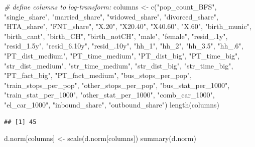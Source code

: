 \documentclass[
]{article}
\newenvironment{Shaded}{\begin{snugshade}}{\end{snugshade}}
\newcommand{\CommentTok}[1]{\textcolor[rgb]{0.56,0.35,0.01}{\textit{#1}}}
\newcommand{\FunctionTok}[1]{\textcolor[rgb]{0.00,0.00,0.00}{#1}}
\newcommand{\NormalTok}[1]{#1}
\newcommand{\OtherTok}[1]{\textcolor[rgb]{0.56,0.35,0.01}{#1}}
\newcommand{\StringTok}[1]{\textcolor[rgb]{0.31,0.60,0.02}{#1}}
\begin{document}
\begin{Shaded}
\begin{Highlighting}[]
\CommentTok{\# define columns to log{-}transform:}
\NormalTok{columns }\OtherTok{\textless{}{-}} \FunctionTok{c}\NormalTok{(}\StringTok{"pop\_count\_BFS"}\NormalTok{, }\StringTok{"single\_share"}\NormalTok{, }\StringTok{"married\_share"}\NormalTok{,}
             \StringTok{"widowed\_share"}\NormalTok{, }\StringTok{"divorced\_share"}\NormalTok{, }\StringTok{"HTA\_share"}\NormalTok{,}
             \StringTok{"FNT\_share"}\NormalTok{, }\StringTok{"X.20"}\NormalTok{, }\StringTok{"X20.40"}\NormalTok{, }\StringTok{"X40.60"}\NormalTok{, }\StringTok{"X.60"}\NormalTok{, }\StringTok{"birth\_munic"}\NormalTok{,}
             \StringTok{"birth\_cant"}\NormalTok{, }\StringTok{"birth\_CH"}\NormalTok{, }\StringTok{"birth\_notCH"}\NormalTok{, }\StringTok{"male"}\NormalTok{, }\StringTok{"female"}\NormalTok{, }
             \StringTok{"resid\_.1y"}\NormalTok{, }\StringTok{"resid\_1.5y"}\NormalTok{, }\StringTok{"resid\_6.10y"}\NormalTok{, }\StringTok{"resid\_.10y"}\NormalTok{,}
             \StringTok{"hh\_1"}\NormalTok{, }\StringTok{"hh\_2"}\NormalTok{, }\StringTok{"hh\_3.5"}\NormalTok{, }\StringTok{"hh\_.6"}\NormalTok{,}
             \StringTok{"PT\_dist\_medium"}\NormalTok{, }\StringTok{"PT\_time\_medium"}\NormalTok{, }\StringTok{"PT\_dist\_big"}\NormalTok{,}
             \StringTok{"PT\_time\_big"}\NormalTok{, }\StringTok{"str\_dist\_medium"}\NormalTok{, }\StringTok{"str\_time\_medium"}\NormalTok{, }
             \StringTok{"str\_dist\_big"}\NormalTok{, }\StringTok{"str\_time\_big"}\NormalTok{, }\StringTok{"PT\_fact\_big"}\NormalTok{, }\StringTok{"PT\_fact\_medium"}\NormalTok{,}
             \StringTok{"bus\_stops\_per\_pop"}\NormalTok{, }\StringTok{"train\_stops\_per\_pop"}\NormalTok{, }\StringTok{"other\_stops\_per\_pop"}\NormalTok{,}
             \StringTok{"bus\_stat\_per\_1000"}\NormalTok{, }\StringTok{"train\_stat\_per\_1000"}\NormalTok{, }\StringTok{"other\_stat\_per\_1000"}\NormalTok{,}
             \StringTok{"comb\_car\_1000"}\NormalTok{, }\StringTok{"el\_car\_1000"}\NormalTok{, }\StringTok{"inbound\_share"}\NormalTok{, }\StringTok{"outbound\_share"}\NormalTok{)}
\FunctionTok{length}\NormalTok{(columns)}
\end{Highlighting}
\end{Shaded}

\begin{verbatim}
## [1] 45
\end{verbatim}

\begin{Shaded}
\begin{Highlighting}[]
\NormalTok{d.norm[columns] }\OtherTok{\textless{}{-}} \FunctionTok{scale}\NormalTok{(d.norm[columns])}
\FunctionTok{summary}\NormalTok{(d.norm)}
\end{Highlighting}
\end{Shaded}
\end{document}
